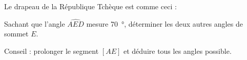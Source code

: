 
\begin{exercice}\label{exo2smath-0239}

    Le drapeau de la République Tchèque est comme ceci :
    \begin{center}

    \end{center}
    Sachant que l'angle \( \widehat{AED}\) mesure \SI{70}{\degree}, déterminer les deux autres angles de sommet \( E\).
    
    Conseil : prolonger le segment \( [AE]\) et déduire tous les angles possible.    

\end{exercice}
